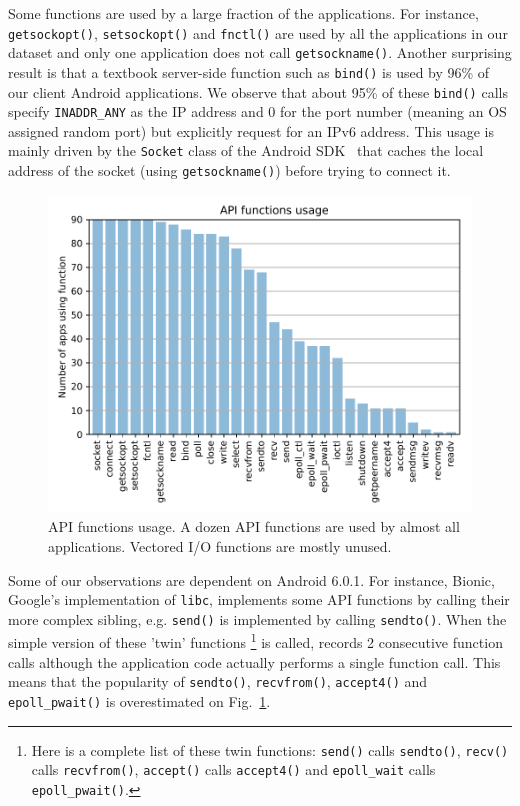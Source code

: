 Some functions are used by a large fraction of the applications. For instance,
\texttt{getsockopt()}, \texttt{setsockopt()} and \texttt{fnctl()} are used by
all the applications in our dataset and only one application does not call
\texttt{get\-sock\-name()}. Another surprising result is that a textbook
server-side function such as \texttt{bind()} is used by 96\% of our client
Android applications.  We observe that about 95\% of these \texttt{bind()}
calls specify \texttt{INADDR\_ANY} as the IP address and 0 for the port number
(meaning an OS assigned random port) but explicitly request for an IPv6
address. This usage is mainly driven by the \texttt{Socket} class of the
Android SDK~\cite{aosp_socket} that caches the local address of the socket
(using \texttt{get\-sock\-name()}) before trying to connect it.

\begin{figure} \centering
    \includegraphics[width=\columnwidth]{figures/functions_bars} \caption{API
    functions usage. \textmd{A dozen API functions are used by almost all
applications. Vectored I/O functions are mostly unused.}}
\label{fig:functions_usage} \end{figure}

Some of our observations are dependent on Android 6.0.1. For instance, Bionic,
Google's implementation of \texttt{libc}, implements some API functions by
calling their more complex sibling, e.g. \texttt{send()} is implemented by
calling \texttt{sendto()}. When the simple version of these 'twin' functions
\footnote{Here is a complete list of these twin functions: \texttt{send()}
    calls \texttt{sendto()}, \texttt{recv()} calls \texttt{recvfrom()},
    \texttt{accept()} calls \texttt{accept4()} and \texttt{epoll\_wait} calls
\texttt{epoll\_pwait()}.} is called, \tcpsnitch records 2 consecutive function
calls although the application code actually performs a single function call.
This means that the popularity of \texttt{sendto()}, \texttt{recvfrom()},
\texttt{accept4()} and \texttt{epoll\_pwait()} is overestimated on
Fig.~\ref{fig:functions_usage}.

